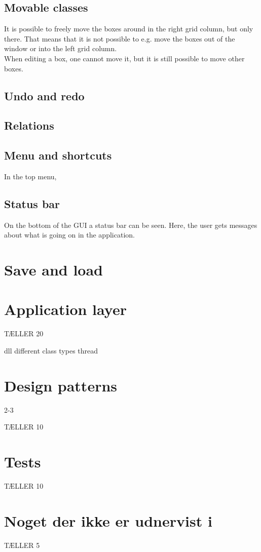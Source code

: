 \subsection{Movable classes}

It is possible to freely move the boxes around in the right grid column, but only there. That means that it is not possible to e.g. move the boxes out of the window or into the left grid column.\\
When editing a box, one cannot move it, but it is still possible to move other boxes.

\subsection{Undo and redo}

\subsection{Relations}

\subsection{Menu and shortcuts}

In the top menu, 

\subsection{Status bar}

On the bottom of the GUI a status bar can be seen. Here, the user gets messages about what is going on in the application.

\section{Save and load}
\label{sec:design_pattern}

\section{Application layer}
\label{sec:app_layer}

TÆLLER 20

dll
different class types
thread

\section{Design patterns}
\label{sec:design_pattern}

2-3

TÆLLER 10


\section{Tests}
\label{sec:tests}

TÆLLER 10

\section{Noget der ikke er udnervist i}


TÆLLER 5